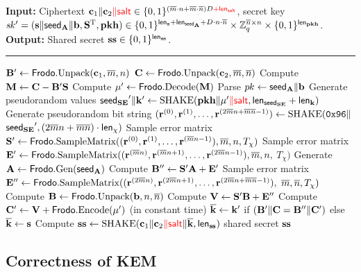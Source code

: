 \documentclass{iacrcc}
\begin{document}
\begin{algorithm}[H]
\caption{\label{alg:KEM:Decaps} $\FrodoKEM.\Decaps$.}
{\bf Input:} Ciphertext $\bfc_1 \| \bfc_2{\color{red}\| \salt} \in \{0,1\}^{(\mbar\cdot n +\mbar\cdot\nbar)D {\color{red}+\lengthsalt}}$, secret key $\sk' = (\bfs \| \seedA \| \bfb, \bfS^\text{T}, \pkh) \in  \{0,1\}^{\lengths + \lengthseedA +D\cdot n \cdot \nbar}\times \bbZ_q^{\nbar\times n} \times \{0,1\}^{\lengthpkhash}$.\\
{\bf Output:} Shared secret $\ssk \in \{0,1\}^\lengthss$.\\[-1.5ex]
\rule{\linewidth}{.5pt}
\vspace{-0.5cm}
\begin{algorithmic}[1]
    \STATE $\bfB' \gets \Frodo.\Unpack(\bfc_1, \mbar, n)$
    \STATE $\bfC \gets \Frodo.\Unpack(\bfc_2, \mbar, \nbar)$    
    \STATE Compute $\bfM \gets \bfC - \bfB'\bfS$
    \STATE Compute $\mu' \gets \Frodo.\Decode(\bfM)$
    \STATE Parse $\pk \gets \seedA \|\bfb$
    \STATE Generate pseudorandom values $\seedSE'\| \bfk' \gets \SHAKE(\pkh \| \mu'{\color{red}\| \salt}, \lengthseedSE + \lengthK)$
   \STATE Generate pseudorandom bit string $ (\bfr^{(0)}, \bfr^{(1)}, \dots, \bfr^{(2\mbar n+\mbar\nbar-1)}) \gets \SHAKE(\mathtt{0x96} \|$ $\seedSE', (2\mbar n+\mbar\nbar) \cdot \lengthchi)$
    \STATE Sample error matrix $\bfS' \gets \Frodo.\SampV((\bfr^{(0)}, \bfr^{(1)}, \dots, \bfr^{(\mbar n-1)}), \mbar, n, T_\chi)$
    \STATE Sample error matrix $\bfE' \gets \Frodo.\SampV((\bfr^{(\mbar n)}, \bfr^{(\mbar n+1)}, \dots, \bfr^{(2\mbar n-1)}), \mbar, n,$ $T_\chi)$
    \STATE Generate $\bfA\gets \Frodo.\gen(\seedA)$
    \STATE Compute $\bfB'' \gets \bfS'\bfA + \bfE'$
    \STATE Sample error matrix $\bfE'' \gets \Frodo.\SampV((\bfr^{(2\mbar n)}, \bfr^{(2\mbar n+1)}, \dots, \bfr^{(2\mbar n+\mbar\nbar-1)}),$ $\mbar, \nbar, T_\chi)$
    \STATE Compute $\bfB \gets \Frodo.\Unpack(\bfb,n,\nbar)$
    \STATE Compute $\bfV \gets \bfS'\bfB + \bfE''$
    \STATE Compute $\bfC' \gets \bfV + \Frodo.\Encode(\mu')$
    \STATE (in constant time) $\overline{\bfk} \gets \bfk'$ if $(\bfB' \| \bfC = \bfB'' \| \bfC')$ else $\overline{\bfk} \gets \bfs$
    \STATE Compute $\ssk \gets \SHAKE(\bfc_1 \| \bfc_2{\color{red}\| \salt} \| \overline{\bfk}, \lengthss)$
    \RETURN shared secret $\ssk$
    \end{algorithmic}
\end{algorithm}   

\subsection{Correctness of \INDCCA KEM}\label{sec:cca-kem-correctness}
\end{document}
